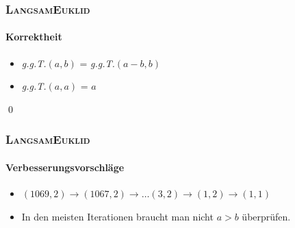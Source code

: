 \documentclass[•]{beamer}
\begin{document}
\begin{frame}
	\frametitle{\textsc{LangsamEuklid}}
	\framesubtitle{Korrektheit}
	\begin{itemize}
	\item \textit{g.g.T.}$(a,b)$ = \textit{g.g.T.}$(a-b,b)$
	\item \textit{g.g.T.}$(a,a)$ = $a$
	\end{itemize}
\qed
\end{frame}
\begin{frame}
	\frametitle{\textsc{LangsamEuklid}}
	\framesubtitle{Verbesserungsvorschl\"age}
	\begin{itemize}
	\item $(1069,2) \rightarrow (1067,2) \rightarrow \dots (3,2) \rightarrow (1,2) \rightarrow (1,1)$
	\item In den meisten Iterationen braucht man nicht $a>b$ \"uberpr\"ufen.
	\end{itemize}
\end{frame}
\end{document}
